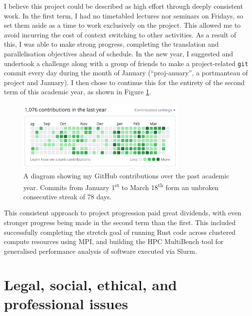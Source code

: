 I believe this project could be described as high effort through deeply consistent work. In the first term, I had no timetabled lectures nor seminars on Fridays, so set them aside as a time to work exclusively on the project. This allowed me to avoid incurring the cost of context switching to other activities. As a result of this, I was able to make strong progress, completing the translation and parallelisation objectives ahead of schedule. In the new year, I suggested and undertook a challenge along with a group of friends to make a project-related \texttt{git} commit every day during the month of January (``proj-anuary'', a portmanteau of project and January). I then chose to continue this for the entirety of the second term of this academic year, as shown in Figure \ref{fig:github_year_long_contributions}.

\begin{figure}[H]
    \centering
    \includegraphics[width=0.75\textwidth]{images/6_project_management/github_year_long_contributions.png}
    \caption{A diagram showing my GitHub contributions over the past academic year. Commits from January 1\textsuperscript{st} to March 18\textsuperscript{th} form an unbroken consecutive streak of 78 days.}
    \label{fig:github_year_long_contributions}
\end{figure}

This consistent approach to project progression paid great dividends, with even stronger progress being made in the second term than the first. This included successfully completing the stretch goal of running Rust code across clustered compute resources using MPI, and building the HPC MultiBench tool for generalised performance analysis of software executed via Slurm.

\section{Legal, social, ethical, and professional issues}
\label{sec:legal-social-ethical-professional-issues}

